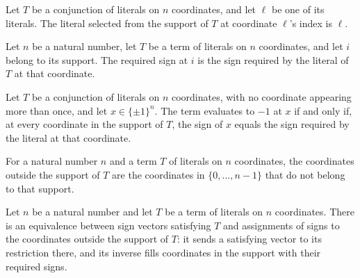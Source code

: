 \begin{theorem}
\label{FABL.DNFTerm.literalAt_eq}
\leanok
{}
Let $T$ be a conjunction of literals on $n$ coordinates, and let $\ell$ be one of its
literals. The literal selected from the support of $T$ at coordinate $\ell$’s index is
$\ell$.
\end{theorem}

\begin{definition}
\label{FABL.DNFTerm.requiredAt}
\leanok
{}
Let $n$ be a natural number, let $T$ be a term of literals on $n$ coordinates, and let
$i$ belong to its support. The required sign at $i$ is the sign required by the literal
of $T$ at that coordinate.
\end{definition}

\begin{theorem}
\label{FABL.DNFTerm.eval_eq_neg_one_iff_requiredAt}
\leanok
{}
Let $T$ be a conjunction of literals on $n$ coordinates, with no coordinate appearing
more than once, and let $x\in\{\pm1\}^n$. The term evaluates to $-1$ at $x$ if and only
if, at every coordinate in the support of $T$, the sign of $x$ equals the sign required
by the literal at that coordinate.
\end{theorem}

\begin{definition}
\label{FABL.DNFTerm.Outside}
\leanok
{}
For a natural number $n$ and a term $T$ of literals on $n$ coordinates, the coordinates
outside the support of $T$ are the coordinates in $\{0,\ldots,n-1\}$ that do not belong
to that support.
\end{definition}

\begin{definition}
\label{FABL.DNFTerm.satisfyingEquiv}
\leanok
{}
Let $n$ be a natural number and let $T$ be a term of literals on $n$ coordinates. There
is an equivalence between sign vectors satisfying $T$ and assignments of signs to the
coordinates outside the support of $T$: it sends a satisfying vector to its restriction
there, and its inverse fills coordinates in the support with their required signs.
\end{definition}

